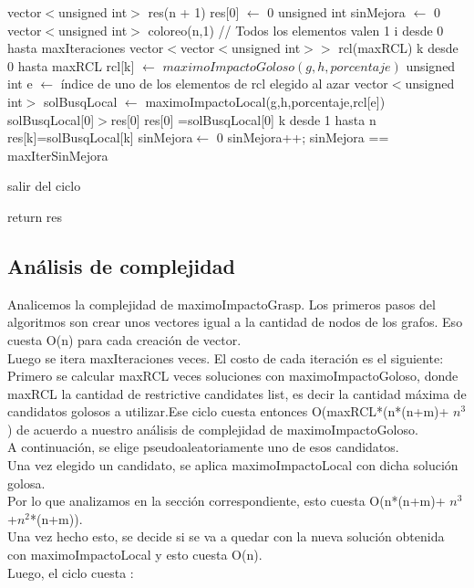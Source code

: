 \begin{algorithm}[H]
\caption{} 
\begin{codebox}

\li vector$<$unsigned int$>$ res(n + 1)
\li res[0] $\gets$ 0
\li unsigned int sinMejora $\gets$ 0
\li
\li vector$<$unsigned int$>$ coloreo(n,1) // Todos los elementos valen 1
\li
\li \For i desde 0 hasta maxIteraciones \Do 
\li vector$<$vector$<$unsigned int$>>$ rcl(maxRCL)
\li 	\For k desde 0 hasta maxRCL \Do
\li 		rcl[k] $\gets$ $maximoImpactoGoloso(g,h, porcentaje)$
		\End
\li
\li		unsigned int e $\gets$ índice de uno de los elementos de rcl elegido al azar
\li
\li 	vector$<$unsigned int$>$ solBusqLocal $\gets$ maximoImpactoLocal(g,h,porcentaje,rcl[e])
\li
\li 	\If solBusqLocal[0]$>$res[0] \Do
\li			res[0] =solBusqLocal[0]
\li
\li			\For k desde 1 hasta n \Do
\li				res[k]=solBusqLocal[k]
\li
			\End
\li			sinMejora$\gets$ 0
\li		\Else \Do
\li			sinMejora++;
\li         \If sinMejora == maxIterSinMejora \Do
            
\li                salir del ciclo
            
            \End
        \End

	\End	
\li
\li return res
\End
\end{codebox}
\end{algorithm}

\subsection{Análisis de complejidad}

\indent Analicemos la complejidad de maximoImpactoGrasp. Los primeros pasos del algoritmos son crear unos vectores igual a la cantidad de nodos de los grafos. Eso cuesta O(n) para cada creación de vector.\\
\indent Luego se itera maxIteraciones veces. El costo de cada iteración es el siguiente:\\
\indent Primero se calcular maxRCL veces soluciones con maximoImpactoGoloso, donde maxRCL la cantidad de restrictive candidates list, es decir la cantidad máxima de candidatos golosos a utilizar.Ese ciclo cuesta entonces O(maxRCL*(n*(n+m)+ $n^{3}$) de acuerdo a nuestro análisis de complejidad de maximoImpactoGoloso.\\
\indent A continuación, se elige pseudoaleatoriamente uno de esos candidatos.\\
\indent Una vez elegido un candidato, se aplica maximoImpactoLocal con dicha solución golosa.\\ Por lo que analizamos en la sección correspondiente, esto cuesta O(n*(n+m)+ $n^{3}$ +$ n^{2}$*(n+m)).\\
\indent Una vez hecho esto, se decide si se va a quedar con la nueva solución obtenida con maximoImpactoLocal y esto cuesta O(n).\\
\indent Luego, el ciclo cuesta :\\

